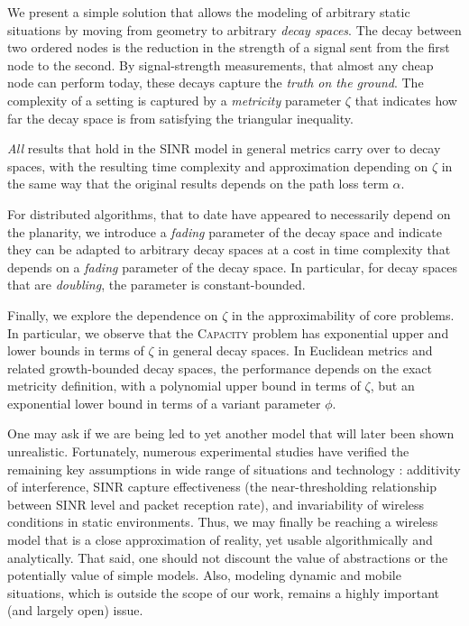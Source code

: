 \documentclass[11pt]{amsart}
\newcommand{\prob}[1]{\textsc{#1}}
\newcommand{\Capacity}{\prob{Capacity}}
\newcommand{\capacity}{\Capacity}
\begin{document}
We present a simple solution that allows the modeling of arbitrary static
situations by moving from geometry to arbitrary \emph{decay spaces}.
The decay between two ordered nodes is the reduction in the strength
of a signal sent from the first node to the second.
By signal-strength measurements, that almost any cheap node can
perform today, these decays capture the \emph{truth on the ground}.
The complexity of a setting is captured by a
\emph{metricity} parameter $\zeta$ that indicates how far the decay
space is from satisfying the triangular inequality.

\emph{All} results that hold in the SINR model in general metrics carry over
to decay spaces, with the resulting time complexity and approximation
depending on $\zeta$ in the same way that the original results depends
on the path loss term $\alpha$.


For distributed algorithms, that to date have appeared to necessarily depend on
the planarity, we introduce a \emph{fading} parameter of the decay space
and indicate they can be adapted to arbitrary decay spaces
at a cost in time complexity that depends on a \emph{fading} parameter
of the decay space. In particular, for decay spaces that are
\emph{doubling}, the parameter is constant-bounded.

Finally, we explore the dependence on $\zeta$ in the approximability
of core problems. In particular, we observe that the {\capacity} problem 
has exponential upper and lower bounds in terms of $\zeta$ in general
decay spaces. In Euclidean metrics and related growth-bounded decay
spaces, the performance depends on the exact metricity definition, 
with a polynomial upper bound in terms of $\zeta$, but an exponential
lower bound in terms of a variant parameter $\phi$.

One may ask if we are being led to yet another model that will later been shown unrealistic. Fortunately, numerous experimental studies have verified the remaining key assumptions in wide range of situations and technology \cite{son2006,MaheshwariJD2008,chen2010,sevani2012sir,us:ICDCS14}: additivity of interference, SINR capture effectiveness (the near-thresholding relationship between SINR level and packet reception rate), and invariability of wireless conditions in static environments. Thus, we may finally be reaching a wireless model that is a close approximation of reality, yet usable algorithmically and analytically.
That said, one should not discount the value of abstractions or the potentially value of simple models. Also, modeling dynamic and mobile situations, which is outside the scope of our work, remains a highly important (and largely open) issue.
\end{document}
